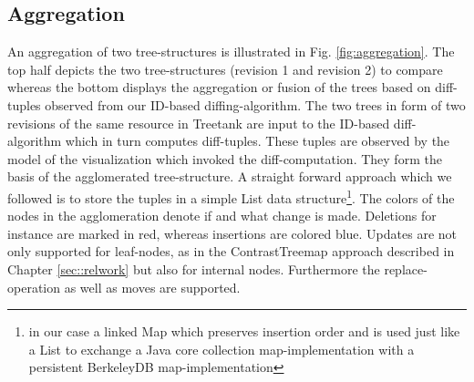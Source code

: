 \subsection{Aggregation}\label{subsec::aggregation}
An aggregation of two tree-structures is illustrated in Fig. \ref{fig:aggregation}. The top half depicts the two tree-structures (revision 1 and revision 2) to compare whereas the bottom displays the aggregation or fusion of the trees based on diff-tuples observed from our ID-based diffing-algorithm. The two trees in form of two revisions of the same resource in Treetank are input to the ID-based diff-algorithm which in turn computes diff-tuples. These tuples are observed by the model of the visualization which invoked the diff-computation. They form the basis of the agglomerated tree-structure. A straight forward approach which we followed is to store the tuples in a simple List data structure\footnote{in our case a linked Map which preserves insertion order and is used just like a List to exchange a Java core collection map-implementation with a persistent BerkeleyDB map-implementation}. The colors of the nodes in the agglomeration denote if and what change is made. Deletions for instance are marked in red, whereas insertions are colored blue. Updates are not only supported for leaf-nodes, as in the ContrastTreemap approach described in Chapter \ref{sec::relwork} but also for internal nodes. Furthermore the replace-operation as well as moves are supported. %

